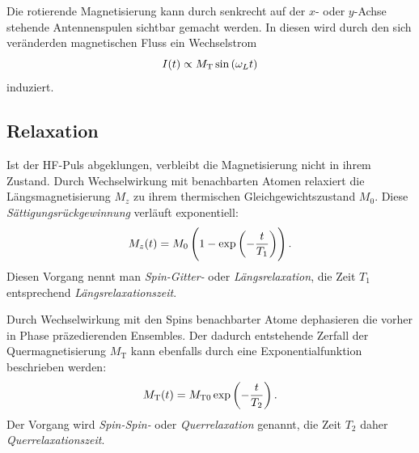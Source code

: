 \documentclass[
    11pt,
    ngerman
]{scrreprt}
\begin{document}
Die rotierende Magnetisierung kann durch senkrecht auf der $x$- oder $y$-Achse stehende Antennenspulen sichtbar gemacht werden. In diesen wird durch den sich veränderden magnetischen Fluss ein Wechselstrom
\[
    I(t) \propto M_\text{T} \sin\left({\omega_L t}\right)
\]
induziert.





\subsection{Relaxation}

Ist der HF-Puls abgeklungen, verbleibt die Magnetisierung nicht in ihrem
Zustand. Durch Wechselwirkung mit benachbarten Atomen relaxiert die Längsmagnetisierung $M_z$ zu ihrem
thermischen Gleichgewichtszustand $M_0$. Diese \emph{Sättigungsrückgewinnung} verläuft exponentiell:
\[
    M_z(t) = M_0\del{1-\dexp{-\frac{t}{T_1}}}.
\]
Diesen Vorgang nennt man \emph{Spin-Gitter-} oder \emph{Längsrelaxation}, die
Zeit $T_1$ entsprechend \emph{Längsrelaxationszeit}.

Durch Wechselwirkung mit den Spins benachbarter Atome dephasieren die vorher in
Phase präzedierenden Ensembles. Der dadurch entstehende Zerfall der
Quermagnetisierung $M_\text{T}$ kann ebenfalls durch eine Exponentialfunktion
beschrieben werden:
\[
    M_\text{T}(t) = M_{\text{T}0}\exp\left({-\frac{t}{T_2}}\right).
\]
Der Vorgang wird \emph{Spin-Spin-} oder \emph{Querrelaxation} genannt, die Zeit $T_2$ daher \emph{Querrelaxationszeit}. 
\end{document}
